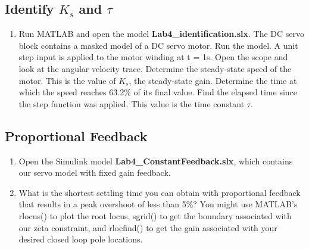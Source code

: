 \documentclass[11pt,a4paper]{article}
\begin{document}
\subsection{Identify $K_{s}$ and $\tau$}
\begin{enumerate}
\item Run MATLAB and open the model \textbf{Lab4\_identification.slx}. The DC servo block contains a masked model of a DC servo motor. Run the model. A unit step input is applied to the motor winding at t = 1s. Open the scope and look at the angular velocity trace. Determine the steady-state speed of the motor. This is the value of $K_{s}$, the steady-state gain. Determine the time at which the speed reaches 63.2\% of its final value. Find the elapsed time since the step function was applied. This value is the time constant $\tau$.
 
\end{enumerate}






\subsection{Proportional Feedback}
\begin{enumerate}
\item Open the Simulink model \textbf{Lab4\_ConstantFeedback.slx}, which contains our servo model with fixed gain feedback. 

\item What is the shortest settling time you can obtain with proportional feedback that results in a peak overshoot of less than 5\%? You might use MATLAB's rlocus() to plot the root locus, sgrid() to get the boundary associated with our zeta constraint, and rlocfind() to get the gain associated with your desired closed loop pole locations.

\end{enumerate}
\end{document}
